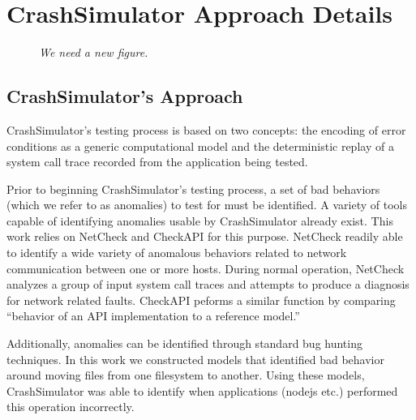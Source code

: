 \section{CrashSimulator Approach Details}
    \begin{figure}[t]
        \center{}
        \caption{\emph{We need a new figure.}}

    \end{figure}

    \subsection{CrashSimulator's Approach}

    CrashSimulator's testing process is based on two concepts: the encoding of error conditions as a generic
    computational model and the deterministic replay of a system call trace recorded from the application being tested.

    Prior to beginning CrashSimulator's testing process, a set of bad behaviors (which we refer to as anomalies) to test
    for must be identified.  A variety of tools capable of identifying anomalies usable by CrashSimulator already
    exist.  This work relies on NetCheck and CheckAPI for this purpose. NetCheck readily able to identify a wide variety
    of anomalous behaviors related to network communication between one or more hosts. During normal operation, NetCheck
    analyzes a group of input system call traces and attempts to produce a diagnosis for network related
    faults. CheckAPI peforms a similar function by comparing ``behavior of an API implementation to a reference model.''

    Additionally, anomalies can be identified through standard bug hunting techniques.  In this work we constructed
    models that identified bad behavior around moving files from one filesystem to another.  Using these models,
    CrashSimulator was able to identify when applications (nodejs etc.) performed this operation incorrectly.


